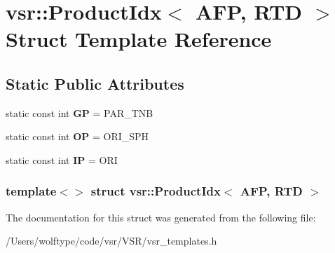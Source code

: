 \hypertarget{structvsr_1_1_product_idx_3_01_a_f_p_00_01_r_t_d_01_4}{\section{vsr\-:\-:Product\-Idx$<$ A\-F\-P, R\-T\-D $>$ Struct Template Reference}
\label{structvsr_1_1_product_idx_3_01_a_f_p_00_01_r_t_d_01_4}
}
\subsection*{Static Public Attributes}
\begin{DoxyCompactItemize}
\item 
\hypertarget{structvsr_1_1_product_idx_3_01_a_f_p_00_01_r_t_d_01_4_a3167b30e9cc9d49bb13e67ce1678f253}{static const int {\bfseries G\-P} = P\-A\-R\-\_\-\-T\-N\-B}\label{structvsr_1_1_product_idx_3_01_a_f_p_00_01_r_t_d_01_4_a3167b30e9cc9d49bb13e67ce1678f253}

\item 
\hypertarget{structvsr_1_1_product_idx_3_01_a_f_p_00_01_r_t_d_01_4_ac6d4523a035980a189caa647e0dbfa98}{static const int {\bfseries O\-P} = O\-R\-I\-\_\-\-S\-P\-H}\label{structvsr_1_1_product_idx_3_01_a_f_p_00_01_r_t_d_01_4_ac6d4523a035980a189caa647e0dbfa98}

\item 
\hypertarget{structvsr_1_1_product_idx_3_01_a_f_p_00_01_r_t_d_01_4_aee72707fbdb465bff63685c9c2f999e3}{static const int {\bfseries I\-P} = O\-R\-I}\label{structvsr_1_1_product_idx_3_01_a_f_p_00_01_r_t_d_01_4_aee72707fbdb465bff63685c9c2f999e3}

\end{DoxyCompactItemize}
\subsubsection*{template$<$$>$ struct vsr\-::\-Product\-Idx$<$ A\-F\-P, R\-T\-D $>$}



The documentation for this struct was generated from the following file\-:\begin{DoxyCompactItemize}
\item 
/\-Users/wolftype/code/vsr/\-V\-S\-R/vsr\-\_\-templates.\-h\end{DoxyCompactItemize}
